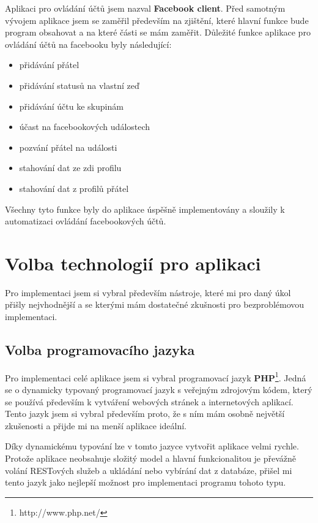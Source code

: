 \documentclass[thesis=M,czech]{FITthesis}[2013/05/10]
\begin{document}
Aplikaci pro ovládání účtů jsem nazval \textbf{Facebook client}. Před samotným vývojem aplikace jsem se zaměřil především na zjištění, které hlavní funkce bude program obsahovat a na které části se mám zaměřit. Důležité funkce aplikace pro ovládání účtů na facebooku byly následující:

\begin{itemize}
  \item přidávání přátel
  \item přidávání statusů na vlastní zeď
  \item přidávání účtu ke skupinám
  \item účast na facebookových událostech
  \item pozvání přátel na události
  \item stahování dat ze zdi profilu
  \item stahování dat z profilů přátel
\end{itemize}

Všechny tyto funkce byly do aplikace úspěšně implementovány a sloužily k automatizaci ovládání facebookových účtů.


\section{Volba technologií pro aplikaci}

Pro implementaci jsem si vybral především nástroje, které mi pro daný úkol přišly nejvhodnější a se kterými mám dostatečné zkušnosti pro bezproblémovou implementaci.

\subsection{Volba programovacího jazyka}

Pro implementaci celé aplikace jsem si vybral programovací jazyk \textbf{PHP}\footnote{http://www.php.net/}. Jedná se o dynamicky typovaný programovací jazyk s veřejným zdrojovým kódem, který se používá především k vytváření webových stránek a internetových aplikací. Tento jazyk jsem si vybral především proto, že s ním mám osobně největší zkušenosti a přijde mi na menší aplikace ideální. 

Díky dynamickému typování lze v tomto jazyce vytvořit aplikace velmi rychle. Protože aplikace neobsahuje složitý model a hlavní funkcionalitou je převážně volání RESTových služeb a ukládání nebo vybírání dat z databáze, přišel mi tento jazyk jako nejlepší možnost pro implementaci programu tohoto typu.
\end{document}
